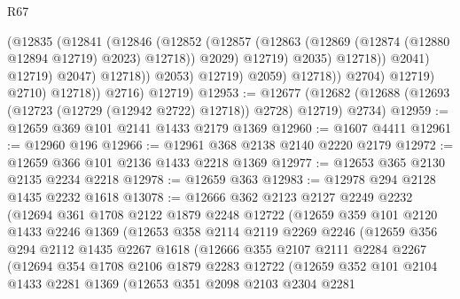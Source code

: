 \begin{lexlean}{R67}
\begin{coremodule}
                                      (@12835
                                        (@12841
                                          (@12846
                                            (@12852
                                              (@12857
                                                (@12863
                                                  (@12869
                                                    (@12874 (@12880 @12894 @12719) @2023)
                                                    @12718))
                                                @2029)
                                              @12719)
                                            @2035)
                                          @12718))
                                      @2041)
                                    @12719)
                                  @2047)
                                @12718))
                            @2053)
                          @12719)
                        @2059)
                      @12718))
                  @2704)
                @12719)
              @2710)
            @12718))
        @2716)
      @12719)
@12953 := @12677
    (@12682 (@12688 (@12693 (@12723 (@12729 (@12942 @2722) @12718)) @2728) @12719) @2734)
@12959 := @12659 @369 @101 @2141 @1433 @2179 @1369
@12960 := @1607 @4411
@12961 := @12960 @196
@12966 := @12961 @368 @2138 @2140 @2220 @2179
@12972 := @12659 @366 @101 @2136 @1433 @2218 @1369
@12977 := @12653 @365 @2130 @2135 @2234 @2218
@12978 := @12659 @363
@12983 := @12978 @294 @2128 @1435 @2232 @1618
@13078 := @12666
    @362
    @2123
    @2127
    @2249
    @2232
    (@12694
      @361
      @1708
      @2122
      @1879
      @2248
      @12722
      (@12659
        @359
        @101
        @2120
        @1433
        @2246
        @1369
        (@12653
          @358
          @2114
          @2119
          @2269
          @2246
          (@12659
            @356
            @294
            @2112
            @1435
            @2267
            @1618
            (@12666
              @355
              @2107
              @2111
              @2284
              @2267
              (@12694
                @354
                @1708
                @2106
                @1879
                @2283
                @12722
                (@12659
                  @352
                  @101
                  @2104
                  @1433
                  @2281
                  @1369
                  (@12653
                    @351
                    @2098
                    @2103
                    @2304
                    @2281

\end{coremodule}
\end{lexlean}
